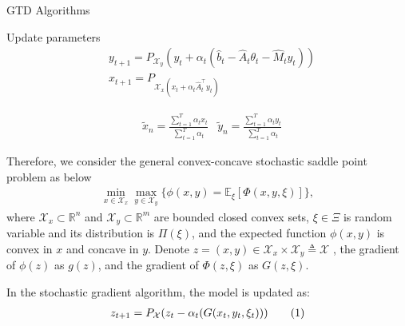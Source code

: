\documentclass[twoside,11pt]{article}
\numberwithin{equation}{section}
\newcommand{\E}{\mathbb{E}}
\newcommand\numberthis{\addtocounter{equation}{1}\tag{\theequation}}
\begin{document}
		
			
			\begin{algorithm} \label{gtd algorithms}
				
				\caption{  GTD  Algorithms}
				\begin{algorithmic}[1]
					\STATE Update parameters \\
					\begin{align*}
					&y_{t+1} = P_{\mathcal{X}_y}\left(y_t + \alpha_t(\hat{b}_t - \hat{A}_t\theta_t -\hat{M}_ty_t)\right)\\
					&x_{t+1} = P_{\mathcal{X}_x\left(x_t + \alpha_t\hat{A}_t^\top y_t\right)}
					\end{align*}
					
					\ENDFOR
					\ENSURE 
					\begin{align}
					&\tilde{x}_n = \frac{\sum_{t=1}^{T}\alpha_t x_t}{\sum_{t=1}^{T}\alpha_t}  &\tilde{y}_n = \frac{\sum_{t=1}^{T}\alpha_t y_t}{\sum_{t=1}^{T}\alpha_t}
					\end{align}
				\end{algorithmic}
			\end{algorithm}
			
		
		
		Therefore, we consider the general convex-concave stochastic saddle point problem as below 
		\begin{align}\label{saddle point problem}
		\min_{x\in\mathcal{X}_x}\max_{y\in\mathcal{X}_y}\lbrace \phi(x,y) = \E_\xi[\Phi(x,y,\xi)]\rbrace,
		\end{align}
		where $ \mathcal{X}_x \subset \mathbb{R}^n $ and $ \mathcal{X}_y \subset \mathbb{R}^m$ are bounded closed convex sets, $ \xi \in \Xi $ is random variable and its distribution is $ \Pi(\xi) $, and the expected function $ \phi(x,y) $ is convex in $ x $ and concave in $ {y } $. 	Denote  $    z = (x,y) \in \mathcal{X}_x\times \mathcal{X}_y \triangleq \mathcal{X}$ , the gradient  of $\phi(z)$ as $ g(z) $, and the gradient of  $ \Phi(z,\xi) $ as $ G(z,\xi) $.
		
		
		In the stochastic gradient algorithm, the model is updated as:
		\begin{align*}
		z_{t+1} =	P_{\mathcal{X} }( z_t - \alpha_t(G(x_t,y_t,\xi_t))) \numberthis\label{iter z}
		\end{align*}
		
\end{document}
